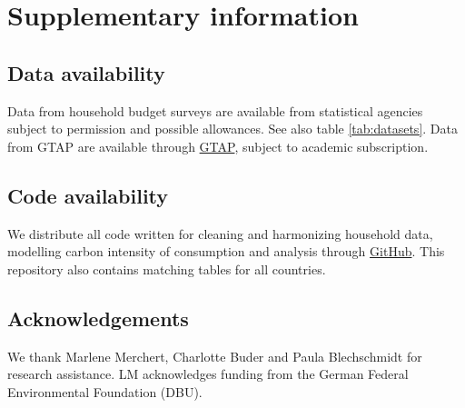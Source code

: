 \documentclass[12pt, a4paper]{article}
\begin{document}
\clearpage

\section{Supplementary information}

\subsection{Data availability} \label{data_availability} Data from household budget surveys are available from statistical agencies subject to permission and possible allowances. See also table \ref{tab:datasets}. Data from GTAP are available through \href{https://www.gtap.agecon.purdue.edu/}{GTAP}, subject to academic subscription.  

\subsection{Code availability} \label{code}
We distribute all code written for cleaning and harmonizing household data, modelling carbon intensity of consumption and analysis through \href{https://github.com/lmissbach/Carbon-Intensity-2023}{GitHub}. This repository also contains matching tables for all countries.

\subsection{Acknowledgements} \label{acknowledgements}

We thank Marlene Merchert, Charlotte Buder and Paula Blechschmidt for research assistance. LM acknowledges funding from the German Federal Environmental Foundation (DBU).
\end{document}
